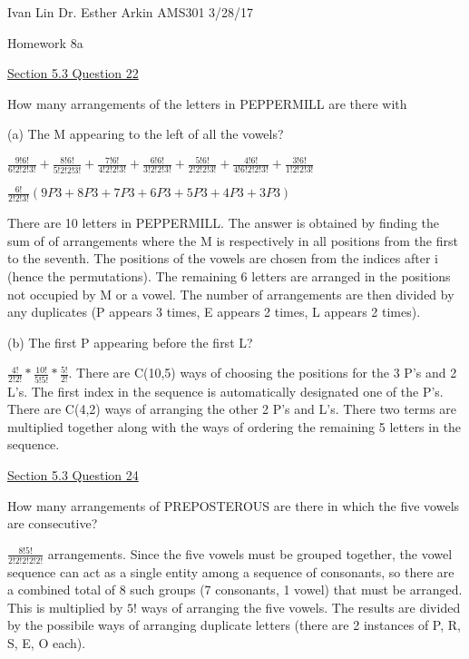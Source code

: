 \documentclass{article}
\begin{document}
Ivan Lin\newline{}
Dr. Esther Arkin\newline{}
AMS301\newline{}
3/28/17

\begin{center}
  Homework 8a
\end{center}

\underline{Section 5.3 Question 22}\newline{}

How many arrangements of the letters in PEPPERMILL are there with\newline{}

(a) The M appearing to the left of all the vowels?\newline{}

$\frac{9!6!}{6!2!2!3!}+\frac{8!6!}{5!2!2!3!}+\frac{7!6!}{4!2!2!3!}+\frac{6!6!}{3!2!2!3!}+\frac{5!6!}{2!2!2!3!}+\frac{4!6!}{4!6!2!2!3!}+\frac{3!6!}{1!2!2!3!}$\newline{}

$\frac{6!}{2!2!3!}(9P3+8P3+7P3+6P3+5P3+4P3+3P3)$


There are 10 letters in PEPPERMILL. The answer is obtained by finding the sum of of arrangements where the M is respectively in all positions from the first to the seventh. The positions of the vowels are chosen from the indices after i (hence the permutations). The remaining 6 letters are arranged in the positions not occupied by M or a vowel. The number of arrangements are then divided by any duplicates (P appears 3 times, E appears 2 times, L appears 2 times).


(b) The first P appearing before the first L?\newline{}

$\frac{4!}{2!2!}*\frac{10!}{5!5!}*\frac{5!}{2!}$. There are C(10,5) ways of choosing the positions for the 3 P's and 2 L's. The first index in the sequence is automatically designated one of the P's. There are C(4,2) ways of arranging the other 2 P's and L's. There two terms are multiplied together along with the ways of ordering the remaining 5 letters in the sequence.


\underline{Section 5.3 Question 24}\newline{}

How many arrangements of PREPOSTEROUS are there in which the five vowels
are consecutive?

$\frac{8!5!}{2!2!2!2!2!}$ arrangements. Since the five vowels must be grouped together, the vowel sequence can act as a single entity among a sequence of consonants, so there are a combined total of 8 such groups (7 consonants, 1 vowel) that must be arranged. This is multiplied by $5!$ ways of arranging the five vowels. The results are divided by the possibile ways of arranging duplicate letters (there are 2 instances of P, R, S, E, O each).
\end{document}
